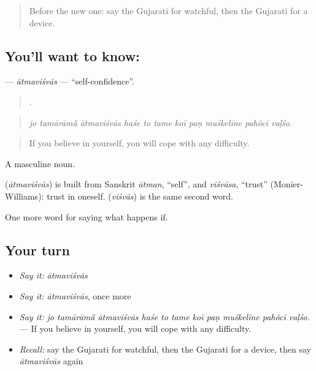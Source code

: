 \label{lesson:GU-C392-atmavisvas}



\begin{quote}
Before the new one: say the Gujarati for watchful, then the Gujarati for a device.
\end{quote}

\subsection*{You'll want to know: }
\textbf{} — \emph{ātmaviśvās} — \textquotedblleft{}self-confidence\textquotedblright{}.

\begin{quote}
          .
\end{quote}

\begin{quote}
\emph{jo tamārāmā̃ ātmaviśvās haśe to tame koī paṇ muśkelīne pahõcī vaḷśo.}
\end{quote}

\begin{quote}
If you believe in yourself, you will cope with any difficulty.
\end{quote}

A masculine noun.

\begin{cousinweb}
\textbf{} (\emph{ātmaviśvās}) is built from Sanskrit \emph{ātman}, \textquotedblleft{}self\textquotedblright{}, and \emph{viśvāsa}, \textquotedblleft{}trust\textquotedblright{} (Monier-Williams): trust in oneself. \textbf{} (\emph{viśvās}) is the same second word.
\end{cousinweb}

\begin{grammarlens}[title={What you've built}]
One more word for saying what happens if.
\end{grammarlens}

\subsection*{Your turn}
\begin{itemize}
\raggedright
  \item \emph{Say it:} \emph{ātmaviśvās}
  \item \emph{Say it:} \emph{ātmaviśvās}, once more
  \item \emph{Say it:} \emph{jo tamārāmā̃ ātmaviśvās haśe to tame koī paṇ muśkelīne pahõcī vaḷśo.} — If you believe in yourself, you will cope with any difficulty.
  \item \emph{Recall:} say the Gujarati for watchful, then the Gujarati for a device, then say \emph{ātmaviśvās} again
\end{itemize}

